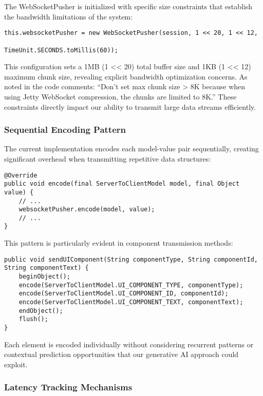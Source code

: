 \documentclass[a4paper, 11pt, twoside, openright]{report}
\begin{document}
The WebSocketPusher is initialized with specific size constraints that establish the bandwidth limitations of the system:

\begin{verbatim}
this.websocketPusher = new WebSocketPusher(session, 1 << 20, 1 << 12, 
                                          TimeUnit.SECONDS.toMillis(60));
\end{verbatim}

This configuration sets a 1MB (1 << 20) total buffer size and 1KB (1 << 12) maximum chunk size, revealing explicit bandwidth optimization concerns. As noted in the code comments: ``Don't set max chunk size > 8K because when using Jetty WebSocket compression, the chunks are limited to 8K.'' These constraints directly impact our ability to transmit large data streams efficiently.

\subsubsection{Sequential Encoding Pattern}

The current implementation encodes each model-value pair sequentially, creating significant overhead when transmitting repetitive data structures:

\begin{verbatim}
@Override
public void encode(final ServerToClientModel model, final Object value) {
    // ...
    websocketPusher.encode(model, value);
    // ...
}
\end{verbatim}

This pattern is particularly evident in component transmission methods:

\begin{verbatim}
public void sendUIComponent(String componentType, String componentId, String componentText) {
    beginObject();
    encode(ServerToClientModel.UI_COMPONENT_TYPE, componentType);
    encode(ServerToClientModel.UI_COMPONENT_ID, componentId);
    encode(ServerToClientModel.UI_COMPONENT_TEXT, componentText);
    endObject();
    flush();
}
\end{verbatim}

Each element is encoded individually without considering recurrent patterns or contextual prediction opportunities that our generative AI approach could exploit.

\subsubsection{Latency Tracking Mechanisms}
\end{document}
